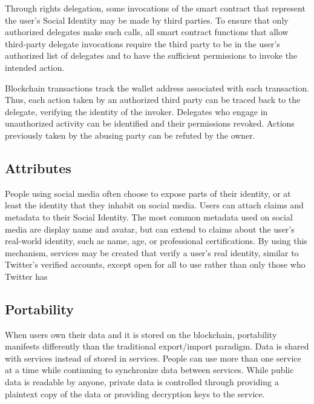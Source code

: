 \documentclass[12pt,letterpaper]{article}
\begin{document}
Through rights delegation, some invocations of the smart contract that represent the
user's Social Identity may be made by third parties. To ensure that only authorized
delegates make such calls, all smart contract functions that allow third-party delegate
invocations require the third party to be in the user's authorized list of delegates and
to have the sufficient permissions to invoke the intended action.

Blockchain transactions track the wallet address associated with each transaction. Thus,
each action taken by an authorized third party can be traced back to the delegate,
verifying the identity of the invoker. Delegates who engage in unauthorized activity can
be identified and their permissions revoked. Actions previously taken by the abusing party
can be refuted by the owner.

\subsection{Attributes}\label{sec:attributes}

People using social media often choose to expose parts of their identity, or at least the
identity that they inhabit on social media. Users can attach claims and metadata to their
Social Identity. The most common metadata used on social media are display name and
avatar, but can extend to claims about the user's real-world identity, such as name, age,
or professional certifications. By using this mechanism, services may be created that
verify a user's real identity, similar to Twitter's verified accounts, except open for all
to use rather than only those who Twitter has \cite{twitter_verified_accounts}

\subsection{Portability}\label{sec:portability}

When users own their data and it is stored on the blockchain, portability manifests
differently than the traditional export/import paradigm. Data is shared with services
instead of stored in services. People can use more than one service at a time while
continuing to synchronize data between services. While public data is readable by anyone,
private data is controlled through providing a plaintext copy of the data or providing
decryption keys to the service.
\end{document}
